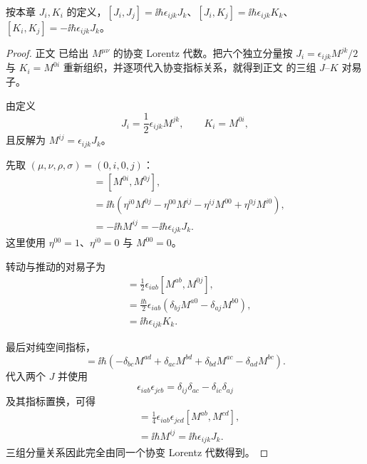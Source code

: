 \begin{corollary}
按本章 $J_i,K_i$ 的定义，$[J_i,J_j]=\ii\hbar\epsilon_{ijk}J_k$、$[J_i,K_j]=\ii\hbar\epsilon_{ijk}K_k$、$[K_i,K_j]=-\ii\hbar\epsilon_{ijk}J_k$。
\end{corollary}
\begin{proof}
正文 已给出 $M^{\mu\nu}$ 的协变 Lorentz 代数。把六个独立分量按 $J_i=\epsilon_{ijk}M^{jk}/2$ 与 $K_i=M^{0i}$ 重新组织，并逐项代入协变指标关系，就得到正文 的三组 $J$--$K$ 对易子。


由定义
\begin{equation*}
 J_i=\frac12\epsilon_{ijk}M^{jk},
 \qquad K_i=M^{0i},
\end{equation*}
且反解为 $M^{ij}=\epsilon_{ijk}J_k$。

先取 $(\mu,\nu,\rho,\sigma)=(0,i,0,j)$：
\begin{align*}
 [K_i,K_j]
 &=[M^{0i},M^{0j}],\\
 &=\ii\hbar\left(
 \eta^{i0}M^{0j}-\eta^{00}M^{ij}
 -\eta^{ij}M^{00}+\eta^{0j}M^{i0}\right),\\
 &=-\ii\hbar M^{ij}
 =-\ii\hbar\epsilon_{ijk}J_k.
\end{align*}
这里使用 $\eta^{00}=1$、$\eta^{i0}=0$ 与 $M^{00}=0$。

转动与推动的对易子为
\begin{align*}
 [J_i,K_j]
 &=\frac12\epsilon_{iab}[M^{ab},M^{0j}],\\
 &=\frac{\ii\hbar}{2}\epsilon_{iab}
 (\delta_{bj}M^{a0}-\delta_{aj}M^{b0}),\\
 &=\ii\hbar\epsilon_{ijk}K_k.
\end{align*}

最后对纯空间指标，
\begin{equation*}
 [M^{ab},M^{cd}]
 =\ii\hbar(-\delta_{bc}M^{ad}+\delta_{ac}M^{bd}
 +\delta_{bd}M^{ac}-\delta_{ad}M^{bc}).
\end{equation*}
代入两个 $J$ 并使用
\begin{equation*}
 \epsilon_{iab}\epsilon_{jcb}
 =\delta_{ij}\delta_{ac}-\delta_{ic}\delta_{aj}
\end{equation*}
及其指标置换，可得
\begin{align*}
 [J_i,J_j]
 &=\frac14\epsilon_{iab}\epsilon_{jcd}[M^{ab},M^{cd}],\\
 &=\ii\hbar M^{ij}
 =\ii\hbar\epsilon_{ijk}J_k.
\end{align*}
三组分量关系因此完全由同一个协变 Lorentz 代数得到。
\end{proof}

